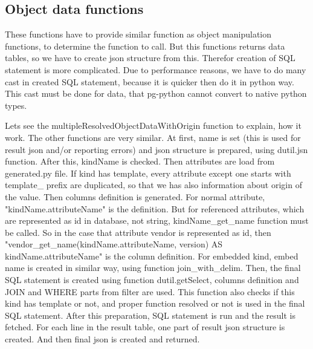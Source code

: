 \documentclass[deska]{subfiles}
\begin{document}
\subsection{Object data functions}
These functions have to provide similar function as object manipulation functions, to determine the function to call. But this functions returns data tables, so we have to create json structure from this. Therefor creation of SQL statement is more complicated. Due to performance reasons, we have to do many cast in created SQL statement, because it is quicker then do it in python way. This cast must be done for data, that pg-python cannot convert to native python types.

Lets see the multipleResolvedObjectDataWithOrigin function to explain, how it work. The other functions are very similar.
At first, name is set (this is used for result json and/or reporting errors) and json structure is prepared, using dutil.jsn function. After this, kindName is checked. Then attributes are load from generated.py file.
If kind has template, every attribute except one starts with template\_ prefix are duplicated, so that we has also information about origin of the value.
Then columns definition is generated. For normal attribute, "kindName.attributeName" is the definition. But for referenced attributes, which are
represented as id in database, not string, kindName\_get\_name function must be called. So in the case that attribute vendor is represented as id, then
"vendor\_get\_name(kindName.attributeName, version) AS kindName.attributeName" is the column definition. For embedded kind, embed name is created in similar way,
using function join\_with\_delim.
Then, the final SQL statement is created using function dutil.getSelect, columns definition and JOIN and WHERE parts from filter are used.
This function also checks if this kind has template or not, and proper function resolved or not is used in the final SQL statement.
After this preparation, SQL statement is run and the result is fetched. For each line in the result table, one part of result json structure is
created. And then final json is created and returned.
\end{document}
